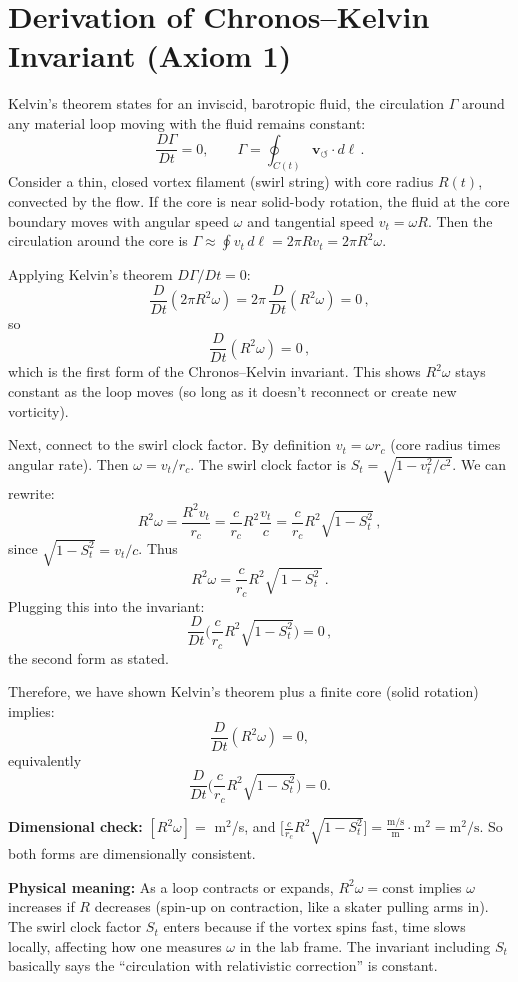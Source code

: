 \documentclass[10pt,reprint,aps,onecolumn,nofootinbib]{revtex4-2}
\newcommand{\vswirl}{\mathbf{v}_{\!\boldsymbol{\circlearrowleft}}}
\begin{document}
	\section{Derivation of Chronos–Kelvin Invariant (Axiom 1)}
	Kelvin’s theorem states for an inviscid, barotropic fluid, the circulation $\Gamma$ around any material loop moving with the fluid remains constant:
	\[
		\frac{D\Gamma}{Dt} = 0, \qquad \Gamma = \oint_{C(t)} \vswirl \cdot d\ell\,.
	\]
	Consider a thin, closed vortex filament (swirl string) with core radius $R(t)$, convected by the flow. If the core is near solid-body rotation, the fluid at the core boundary moves with angular speed $\omega$ and tangential speed $v_t = \omega R$. Then the circulation around the core is $\Gamma \approx \oint v_t\,d\ell = 2\pi R v_t = 2\pi R^2 \omega$.

	Applying Kelvin’s theorem $D\Gamma/Dt=0$:
	\[
		\frac{D}{Dt}(2\pi R^2 \omega) = 2\pi\,\frac{D}{Dt}(R^2 \omega) = 0\,,
	\]
	so
	\[
		\frac{D}{Dt}(R^2 \omega) = 0\,,
	\]
	which is the first form of the Chronos–Kelvin invariant. This shows $R^2 \omega$ stays constant as the loop moves (so long as it doesn’t reconnect or create new vorticity).

	Next, connect to the swirl clock factor. By definition $v_t = \omega r_c$ (core radius times angular rate). Then $\omega = v_t/r_c$. The swirl clock factor is $S_t = \sqrt{1 - v_t^2/c^2}$. We can rewrite:
	\[
		R^2 \omega = \frac{R^2 v_t}{r_c} = \frac{c}{r_c} R^2 \frac{v_t}{c} = \frac{c}{r_c} R^2 \sqrt{1 - S_t^2}\,,
	\]
	since $\sqrt{1 - S_t^2} = v_t/c$. Thus
	\[
		R^2 \omega = \frac{c}{r_c} R^2 \sqrt{\,1 - S_t^2\,}\,.
	\]
	Plugging this into the invariant:
	\[
		\frac{D}{Dt}\Big(\frac{c}{r_c} R^2 \sqrt{1 - S_t^2}\Big) = 0\,,
	\]
	the second form as stated.

	Therefore, we have shown Kelvin’s theorem plus a finite core (solid rotation) implies:
	\[
		\frac{D}{Dt}(R^2 \omega) = 0,
	\]
	equivalently
	\[
		\frac{D}{Dt}\Big(\frac{c}{r_c}R^2\sqrt{1 - S_t^2}\Big) = 0.
	\]

	\noindent\textbf{Dimensional check:} $[R^2 \omega] =$ m$^2$/s, and
	$\big[\frac{c}{r_c}R^2\sqrt{1 - S_t^2}\big] = \frac{\text{m/s}}{\text{m}} \cdot \text{m}^2 = \text{m}^2/\text{s}$. So both forms are dimensionally consistent.

	\noindent\textbf{Physical meaning:} As a loop contracts or expands, $R^2 \omega = \text{const}$ implies $\omega$ increases if $R$ decreases (spin-up on contraction, like a skater pulling arms in). The swirl clock factor $S_t$ enters because if the vortex spins fast, time slows locally, affecting how one measures $\omega$ in the lab frame. The invariant including $S_t$ basically says the “circulation with relativistic correction” is constant.
\end{document}
